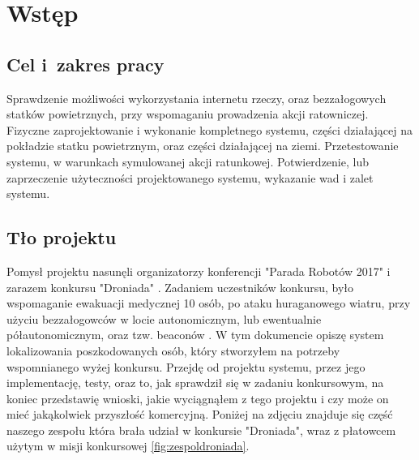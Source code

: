 \section{Wstęp}
\suppressfloats[t]  %
\subsection{Cel i~zakres pracy}

Sprawdzenie możliwości wykorzystania internetu rzeczy, oraz bezzałogowych statków powietrznych, przy wspomaganiu prowadzenia akcji ratowniczej. Fizyczne zaprojektowanie i wykonanie kompletnego systemu, części działającej na pokładzie statku powietrznym, oraz części działającej na ziemi. Przetestowanie systemu, w warunkach symulowanej akcji ratunkowej. Potwierdzenie, lub zaprzeczenie użyteczności projektowanego systemu, wykazanie wad i zalet systemu.

\subsection{Tło projektu}

Pomysł projektu nasunęli organizatorzy konferencji "Parada Robotów 2017" i zarazem konkursu "Droniada" \cite{droniada}. Zadaniem uczestników konkursu, było wspomaganie ewakuacji medycznej 10 osób, po ataku huraganowego wiatru, przy użyciu bezzałogowców w locie autonomicznym, lub ewentualnie półautonomicznym, oraz tzw. beaconów \cite{beacon}. W tym dokumencie opiszę system lokalizowania poszkodowanych osób, który stworzyłem na potrzeby wspomnianego wyżej konkursu. Przejdę od projektu systemu, przez jego implementację, testy, oraz to, jak sprawdził się w zadaniu konkursowym, na koniec przedstawię wnioski, jakie wyciągnąłem z tego projektu i czy może on mieć jakąkolwiek przyszłość komercyjną. Poniżej na zdjęciu znajduje się część naszego zespołu która brała udział w konkursie "Droniada", wraz z płatowcem użytym w misji konkursowej \ref{fig:zespoldroniada}.


